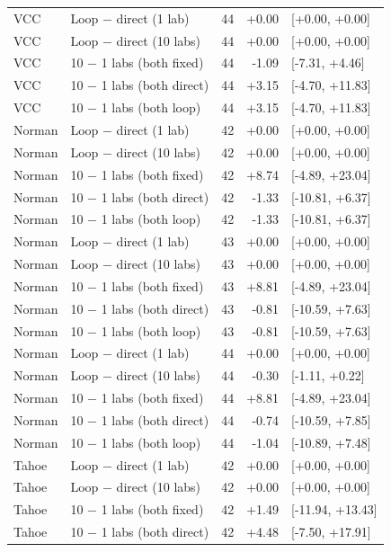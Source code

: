 \begin{longtable}{llrrl}
\midrule
VCC & Loop $-$ direct (1 lab) & 44 & +0.00 & [+0.00, +0.00] \\
VCC & Loop $-$ direct (10 labs) & 44 & +0.00 & [+0.00, +0.00] \\
VCC & 10 $-$ 1 labs (both fixed) & 44 & -1.09 & [-7.31, +4.46] \\
VCC & 10 $-$ 1 labs (both direct) & 44 & +3.15 & [-4.70, +11.83] \\
VCC & 10 $-$ 1 labs (both loop) & 44 & +3.15 & [-4.70, +11.83] \\
\midrule
Norman & Loop $-$ direct (1 lab) & 42 & +0.00 & [+0.00, +0.00] \\
Norman & Loop $-$ direct (10 labs) & 42 & +0.00 & [+0.00, +0.00] \\
Norman & 10 $-$ 1 labs (both fixed) & 42 & +8.74 & [-4.89, +23.04] \\
Norman & 10 $-$ 1 labs (both direct) & 42 & -1.33 & [-10.81, +6.37] \\
Norman & 10 $-$ 1 labs (both loop) & 42 & -1.33 & [-10.81, +6.37] \\
\midrule
Norman & Loop $-$ direct (1 lab) & 43 & +0.00 & [+0.00, +0.00] \\
Norman & Loop $-$ direct (10 labs) & 43 & +0.00 & [+0.00, +0.00] \\
Norman & 10 $-$ 1 labs (both fixed) & 43 & +8.81 & [-4.89, +23.04] \\
Norman & 10 $-$ 1 labs (both direct) & 43 & -0.81 & [-10.59, +7.63] \\
Norman & 10 $-$ 1 labs (both loop) & 43 & -0.81 & [-10.59, +7.63] \\
\midrule
Norman & Loop $-$ direct (1 lab) & 44 & +0.00 & [+0.00, +0.00] \\
Norman & Loop $-$ direct (10 labs) & 44 & -0.30 & [-1.11, +0.22] \\
Norman & 10 $-$ 1 labs (both fixed) & 44 & +8.81 & [-4.89, +23.04] \\
Norman & 10 $-$ 1 labs (both direct) & 44 & -0.74 & [-10.59, +7.85] \\
Norman & 10 $-$ 1 labs (both loop) & 44 & -1.04 & [-10.89, +7.48] \\
\midrule
Tahoe & Loop $-$ direct (1 lab) & 42 & +0.00 & [+0.00, +0.00] \\
Tahoe & Loop $-$ direct (10 labs) & 42 & +0.00 & [+0.00, +0.00] \\
Tahoe & 10 $-$ 1 labs (both fixed) & 42 & +1.49 & [-11.94, +13.43] \\
Tahoe & 10 $-$ 1 labs (both direct) & 42 & +4.48 & [-7.50, +17.91] \\

\end{longtable}

